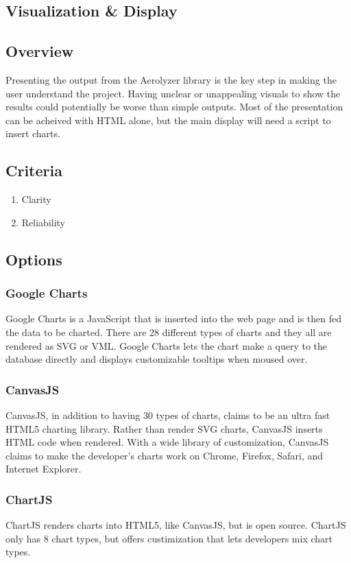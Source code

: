 \documentclass[onecolumn, draftclsnofoot,10pt, compsoc]{IEEEtran}
\begin{document}
\begin{singlespace}
\section{Visualization \& Display}
\subsection{Overview}
Presenting the output from the Aerolyzer library is the key step in making the user understand the project.
Having unclear or unappealing visuals to show the results could potentially be worse than simple outputs.
Most of the presentation can be acheived with HTML alone, but the main display will need a script to insert charts.
\subsection{Criteria}
\begin{enumerate}
\item Clarity
\item Reliability
\end{enumerate}
\subsection{Options}
\subsubsection{Google Charts}
Google Charts is a JavaScript that is inserted into the web page and is then fed the data to be charted.
There are 28 different types of charts and they all are rendered as SVG or VML.
Google Charts lets the chart make a query to the database directly and displays customizable tooltips when moused over.
\subsubsection{CanvasJS}
CanvasJS, in addition to having 30 types of charts, claims to be an ultra fast HTML5 charting library.
Rather than render SVG charts, CanvasJS inserts HTML code when rendered.
With a wide library of customization, CanvasJS claims to make the developer's charts work on Chrome, Firefox, Safari, and Internet Explorer.
\subsubsection{ChartJS}
ChartJS renders charts into HTML5, like CanvasJS, but is open source.
ChartJS only has 8 chart types, but offers custimization that lets developers mix chart types.

\end{singlespace}
\end{document}
